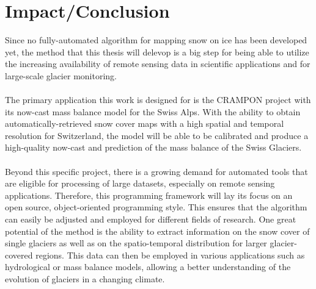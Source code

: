 \documentclass[12pt]{article}
\begin{document}
\section{Impact/Conclusion}
Since no fully-automated algorithm for mapping snow on ice has been developed yet, the method that this thesis will delevop is a big step for being able to utilize the increasing availability of remote sensing data in scientific applications and for large-scale glacier monitoring.
\\
\\
The primary application this work is designed for is the CRAMPON project with its now-cast mass balance model for the Swiss Alps. With the ability to obtain automatically-retrieved snow cover maps with a high spatial and temporal resolution for Switzerland, the model will be able to be calibrated and produce a high-quality now-cast and prediction of the mass balance of the Swiss Glaciers.\\
\\
Beyond this specific project, there is a growing demand for automated tools that are eligible for processing of large datasets, especially on remote sensing applications. Therefore, this programming framework will lay its focus on an open source, object-oriented programming style. This ensures that the algorithm can easily be adjusted and employed for different fields of research. One great potential of the method is the ability to extract information on the snow cover of single glaciers as well as on the spatio-temporal distribution for larger glacier-covered regions. This data can then be employed in various applications such as hydrological or mass balance models, allowing a better understanding of the evolution of glaciers in a changing climate.\\
\\





\nocite{*}
\pagebreak



\end{document}
